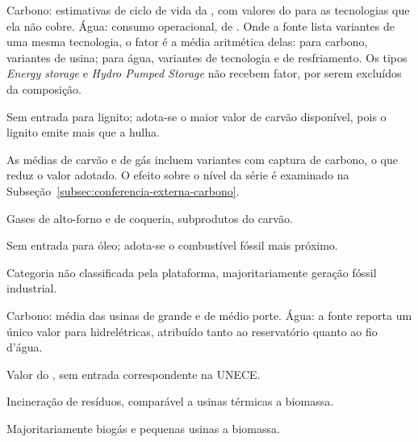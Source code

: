 \begin{table}[htb]
\begin{threeparttable}
\begin{tabular}{@{}llrr@{}}
      \bottomrule
    \end{tabular}
    \begin{tablenotes}\footnotesize
      \item Carbono: estimativas de ciclo de vida da \textcite{unece-carbon}, com valores do
        \textcite{carbon-ipcc-2014} para as tecnologias que ela não cobre. Água: consumo
        operacional, de \textcite{water-macknick-2012}. Onde a fonte lista variantes de uma mesma
        tecnologia, o fator é a média aritmética delas: para carbono, variantes de usina; para água,
        variantes de tecnologia e de resfriamento. Os tipos \textit{Energy storage} e
        \textit{Hydro Pumped Storage} não recebem fator, por serem excluídos da composição.
      \item[a] Sem entrada para lignito; adota-se o maior valor de carvão disponível, pois o lignito
        emite mais que a hulha.
      \item[b] As médias de carvão e de gás incluem variantes com captura de carbono, o que reduz o
        valor adotado. O efeito sobre o nível da série é examinado na
        Subseção~\ref{subsec:conferencia-externa-carbono}.
      \item[c] Gases de alto-forno e de coqueria, subprodutos do carvão.
      \item[d] Sem entrada para óleo; adota-se o combustível fóssil mais próximo.
      \item[e] Categoria não classificada pela plataforma, majoritariamente geração fóssil
        industrial.
      \item[f] Carbono: média das usinas de grande e de médio porte. Água: a fonte reporta um único
        valor para hidrelétricas, atribuído tanto ao reservatório quanto ao fio d'água.
      \item[g] Valor do \textcite{carbon-ipcc-2014}, sem entrada correspondente na UNECE.
      \item[h] Incineração de resíduos, comparável a usinas térmicas a biomassa.
      \item[i] Majoritariamente biogás e pequenas usinas a biomassa.
    \end{tablenotes}
  \end{threeparttable}
\end{table}

